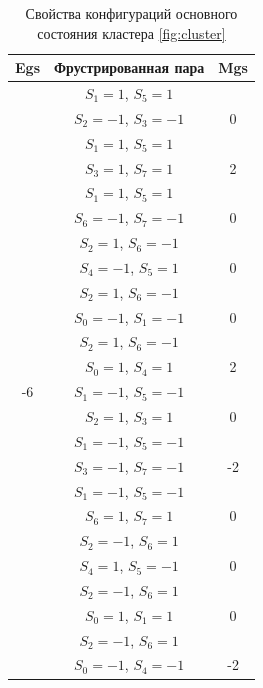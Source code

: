 \documentclass[utf8, babel, sor, jor, amsmath, amssymb, reprint]{elsarticle} %
\begin{document}
\begin{table}[H]
	\centering
	\begin{tabular}{|c|c|c|}
		\hline
		Egs   &   Фрустрированная пара & Mgs\\
		\hline
		  &  $S_1=1$, $S_5=1$ & \\
		      &    $S_2=-1$, $S_3=-1$ &0 \\
		 \cline{2-3}
		   &  $S_1=1$, $S_5=1$ &\\
		      &    $S_3=1$, $S_7=1$ & 2\\
		 \cline{2-3}
		   &  $S_1=1$, $S_5=1$ & \\
		      &    $S_6=-1$, $S_7=-1$ & 0\\
		 \cline{2-3}
		  &  $S_2=1$, $S_6=-1$ & \\
				&    $S_4=-1$, $S_5=1$ & 0\\
		 \cline{2-3}
		  &  $S_2=1$, $S_6=-1$ &\\
				&    $S_0=-1$, $S_1=-1$ & 0\\
		 \cline{2-3}
		   &  $S_2=1$, $S_6=-1$ &\\
				&    $S_0=1$, $S_4=1$ & 2\\
				\cline{2-3}
				-6	\multirow{3}{*}{}
		   &  $S_1=-1$, $S_5=-1$ &\\
			&    $S_2=1$, $S_3=1$ & 0\\
		\cline{2-3}
		   &  $S_1=-1$, $S_5=-1$ &\\
			&    $S_3=-1$, $S_7=-1$ & -2\\
		\cline{2-3}
		   &  $S_1=-1$, $S_5=-1$ &\\
			&    $S_6=1$, $S_7=1$ & 0\\
	\cline{2-3}
		   &  $S_2=-1$, $S_6=1$ &\\
			&    $S_4=1$, $S_5=-1$ & 0\\
	\cline{2-3}
		   &  $S_2=-1$, $S_6=1$ &\\
			&    $S_0=1$, $S_1=1$ & 0\\
		\cline{2-3}
		   &  $S_2=-1$, $S_6=1$ &\\
			&    $S_0=-1$, $S_4=-1$ & -2\\
		\hline
	\end{tabular}
	\caption{Свойства конфигураций основного состояния кластера \eqref{fig:cluster}}
	\label{tab:gs_cl}
\end{table}
\end{document}
